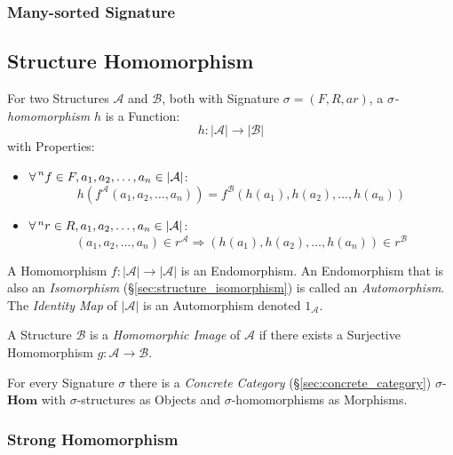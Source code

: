 \subsubsection{Many-sorted Signature}\label{sec:many_sorted_signature}



\subsection{Structure Homomorphism}\label{sec:structure_homomorphism}

For two Structures $\mathcal{A}$ and $\mathcal{B}$, both with
Signature $\sigma = (F,R,ar)$, a \emph{$\sigma$-homomorphism} $h$ is a
Function:
\[
    h : |\mathcal{A}| \rightarrow |\mathcal{B}|
\]
with Properties:
\begin{itemize}
    \item $\forall \prescript{n}{}{f} \in F,
    a_1, a_2,\ldots, a_n \in |\mathcal{A}|$:
\[
    h (f^\mathcal{A}(a_1, a_2,\ldots, a_n))
    = f^\mathcal{B} (h(a_1), h(a_2),\ldots, h(a_n))
\]
    \item $\forall \prescript{n}{}{r} \in R,
    a_1, a_2,\ldots, a_n \in |\mathcal{A}|$:
\[
    (a_1,a_2,\ldots,a_n) \in r^\mathcal{A} \Rightarrow
    (h(a_1), h(a_2),\ldots,h(a_n)) \in r^\mathcal{B}
\]
\end{itemize}
A Homomorphism $f : |\mathcal{A}| \rightarrow |\mathcal{A}|$ is an
Endomorphism. An Endomorphism that is also an \emph{Isomorphism}
(\S\ref{sec:structure_isomorphism}) is called an \emph{Automorphism}.
The \emph{Identity Map} of $|\mathcal{A}|$ is an Automorphism denoted
$1_\mathcal{A}$.

A Structure $\mathcal{B}$ is a \emph{Homomorphic Image} of
$\mathcal{A}$ if there exists a Surjective Homomorphism $g :
\mathcal{A} \rightarrow \mathcal{B}$.

For every Signature $\sigma$ there is a \emph{Concrete Category}
(\S\ref{sec:concrete_category}) $\sigma$-$\mathbf{Hom}$ with
$\sigma$-structures as Objects and $\sigma$-homomorphisms as
Morphisms.



\subsubsection{Strong Homomorphism}\label{sec:strong_homomorphism}

